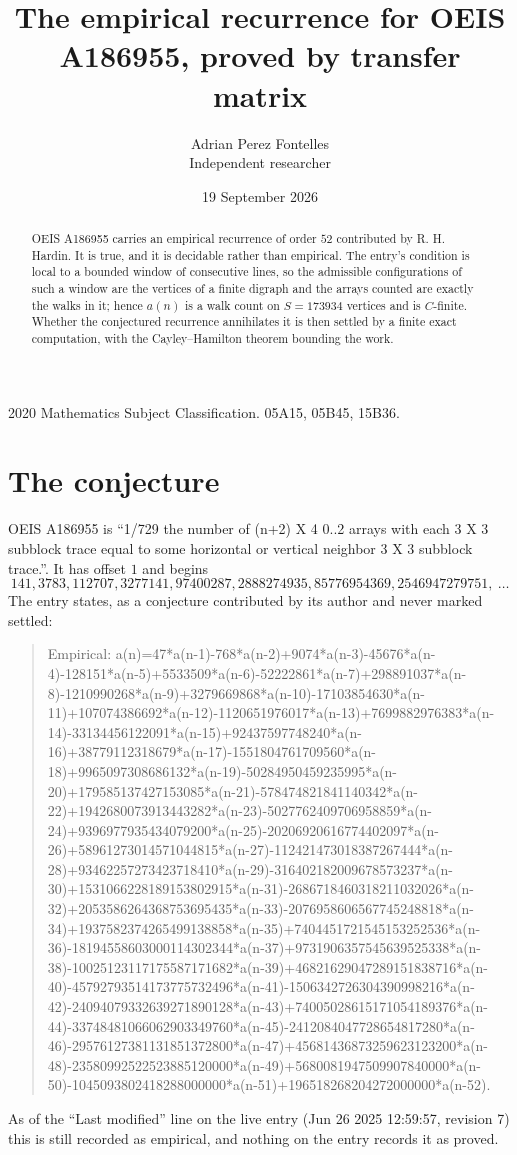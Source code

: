 \documentclass[11pt,a4paper]{article}
\title{The empirical recurrence for OEIS A186955, proved by transfer matrix}
\author{Adrian Perez Fontelles\\ \small Independent researcher}
\date{19 September 2026}
\theoremstyle{plain}
\theoremstyle{definition}
\begin{document}
\maketitle

\begin{abstract}
OEIS A186955 carries an empirical recurrence of order $52$ contributed by R. H. Hardin. It is
true, and it is decidable rather than empirical. The entry's condition is local to a bounded window of consecutive lines, so
the admissible configurations of such a window are the vertices of a finite digraph and the
arrays counted are exactly the walks in it; hence $a(n)$ is a walk count on $S=173934$ vertices
and is $C$-finite. Whether the conjectured recurrence annihilates it is then settled by a
finite exact computation, with the Cayley--Hamilton theorem bounding the work.
\end{abstract}

\noindent\small 2020 Mathematics Subject Classification. 05A15, 05B45, 15B36.\normalsize

\section{The conjecture}

OEIS A186955 is ``1/729 the number of (n+2) X 4 0..2 arrays with each 3 X 3 subblock trace equal to some horizontal or vertical neighbor 3 X 3 subblock trace.''. It has offset $1$ and begins
\[
141, 3783, 112707, 3277141, 97400287, 2888274935, 85776954369, 2546947279751,\ \dots
\]
The entry states, as a conjecture contributed by its author and never marked settled:
\begin{quote}\raggedright\small
Empirical: a(n)=47*a(n-1)-768*a(n-2)+9074*a(n-3)-45676*a(n-4)-128151*a(n-5)+5533509*a(n-6)-52222861*a(n-7)+298891037*a(n-8)-1210990268*a(n-9)+3279669868*a(n-10)-17103854630*a(n-11)+107074386692*a(n-12)-1120651976017*a(n-13)+7699882976383*a(n-14)-33134456122091*a(n-15)+92437597748240*a(n-16)+38779112318679*a(n-17)-1551804761709560*a(n-18)+9965097308686132*a(n-19)-50284950459235995*a(n-20)+179585137427153085*a(n-21)-578474821841140342*a(n-22)+1942680073913443282*a(n-23)-5027762409706958859*a(n-24)+9396977935434079200*a(n-25)-20206920616774402097*a(n-26)+58961273014571044815*a(n-27)-112421473018387267444*a(n-28)+93462257273423718410*a(n-29)-316402182009678573237*a(n-30)+1531066228189153802915*a(n-31)-2686718460318211032026*a(n-32)+2053586264368753695435*a(n-33)-2076958606567745248818*a(n-34)+1937582374265499138858*a(n-35)+7404451721545153252536*a(n-36)-18194558603000114302344*a(n-37)+9731906357545639525338*a(n-38)-10025123117175587171682*a(n-39)+46821629047289151838716*a(n-40)-45792793514173775732496*a(n-41)-1506342726304390998216*a(n-42)-24094079332639271890128*a(n-43)+74005028615171054189376*a(n-44)-33748481066062903349760*a(n-45)-2412084047728654817280*a(n-46)-29576127381131851372800*a(n-47)+45681436873259623123200*a(n-48)-23580992522523885120000*a(n-49)+5680081947509907840000*a(n-50)-1045093802418288000000*a(n-51)+196518268204272000000*a(n-52).
\end{quote}
As of the ``Last modified'' line on the live entry (Jun 26 2025 12:59:57, revision 7) this is still
recorded as empirical, and nothing on the entry records it as proved.
\end{document}
